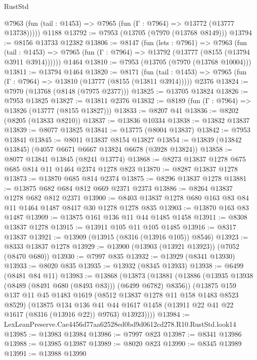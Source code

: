 \begin{lexlean}{RustStd}
\begin{coremodule}
      @7963 (fun (tail : @1453) => @7965 (fun (Γ : @7964) => @13772 (@13777 @13738)))))
    @1188
@13792 := @7953 (@13705 (@7970 (@13768 @8149)))
@13794 := @8156 @13733 @12382
@13806 := @8147
    (fun (lets : @7961) =>
    @7963
      (fun (tail : @1453) =>
      @7965 (fun (Γ : @7964) => @13792 (@13777 (@8155 (@13794 @3911 @3914))))))
    @1464
@13810 := @7953 (@13705 (@7970 (@13768 @10004)))
@13811 := @13794 @1464
@13820 := @8171
    (fun (tail : @1453) => @7965 (fun (Γ : @7964) => @13810 (@13777 (@8155 (@13811 @3914)))))
    @2376
@13824 := @7970 (@13768 (@8148 (@7975 @2377)))
@13825 := @13705 @13824
@13826 := @7953 @13825
@13827 := @13811 @2376
@13832 := @8189 (fun (Γ : @7964) => @13826 (@13777 (@8155 @13827)))
@13833 := @8207 @41
@13836 := @8202 (@8205 (@13833 @8210))
@13837 := @13836 @10334
@13838 := @13832 @13837
@13839 := @8077 @13825
@13841 := @13775 (@8004 @13837)
@13842 := @7953 @13841
@13845 := @8011 @13837 @8154 @13827
@13854 := @13839 (@13842 @13845) (@4057 @6671 @6667 @13824 @6678 (@3928 @13824))
@13858 := @8077 @13841 @13845 (@8241 @13774)
@13868 := @8273 @13837 @1278 @675 @685 @814 @11 @1464 @2374 @1278 @823
@13870 := @8287 @13837 @1278
@13873 := @13870 @685 @814 @2374
@13875 := @8296 @13837 @1278
@13881 := @13875 @682 @684 @812 @669 @2371 @2373
@13886 := @8264 @13837 @1278 @682 @812 @2371
@13900 := @8403 @13837 @1278 @680 @163 @83 @84 @11 @1464 @1487 @8417 @30 @1278 @1278 @835
@13903 := @13870 @163 @83 @1487
@13909 := @13875 @161 @136 @11 @44 @1485 @1458
@13911 := @8308 @13837 @1278
@13915 := @13911 @105 @11 @105 @1485
@13916 := @8317 @13837
@13921 := @13909 (@13915 (@8316 (@13916 @105)) @8546)
@13923 := @8333 @13837 @1278
@13929 := @13900 (@13903 (@13921 @13923)) (@7052 (@8470 @680))
@13930 := @7997 @835
@13932 := @13929 (@8341 @13930)
@13933 := @8020 @835
@13935 := @13932 (@8345 @13933)
@13938 := @6499 (@8481 @84 @11)
@13983 := @13868
    (@13873
      (@13881
        (@13886 (@13935 @13938 (@8489 (@8491 @680 (@8493 @83))) (@6499 @6782) @8356))
        (@13875
          @159
          @137
          @11
          @45
          @1483
          @1619
          (@8512 @13837 @1278 @11 @158 @1483 @8523 @8529)
          (@13875
            @134
            @136
            @41
            @44
            @1617
            @1458
            (@13911 @22 @41 @22 @1617 (@8316 (@13916 @22)) @9763)
            @13923))))
@13984 := LexLeanPreserve.Cae4456d77aa62528ed0bd9d0612cd278.R10.RustStd.look14
@13985 := @13983 @13984
@13986 := @7997 @823
@13987 := @8341 @13986
@13988 := @13985 @13987
@13989 := @8020 @823
@13990 := @8345 @13989
@13991 := @13988 @13990

\end{coremodule}
\end{lexlean}

